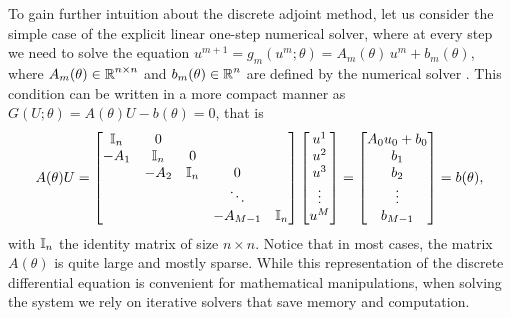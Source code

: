 To gain further intuition about the discrete adjoint method, let us consider the simple case of the explicit linear one-step numerical solver, where at every step we need to solve the equation $u^{m+1} = g_m (u^m; \theta) = A_m (\theta) \, u^m + b_m(\theta)$, where $A_m(\theta) \in \operatorname{\mathbb{R}}^{n \times n}$ and $b_m(\theta) \in \operatorname{\mathbb{R}}^n$ are defined by the numerical solver \cite{Johnson}. 
This condition can be written in a more compact manner as $G(U; \theta)=A(\theta) U - b(\theta) = 0$, that is 
\begin{equation}
    A(\theta) U 
    = 
    \begin{bmatrix}
        \operatorname{\mathbb{I}}_{n} & 0 &   &  & \\
        -A_1 & \operatorname{\mathbb{I}}_{n} & 0 &  &  \\
          & -A_2 & \operatorname{\mathbb{I}}_{n} & 0 &  \\
         &  &   & \ddots &   \\
         &  &  & -A_{M-1} & \operatorname{\mathbb{I}}_{n}
    \end{bmatrix}
    \begin{bmatrix}
        u^1 \\
        u^2 \\
        u^3 \\
        \vdots \\
        u^M
    \end{bmatrix}
    = 
    \begin{bmatrix}
        A_0 u_0 + b_0 \\
        b_1 \\
        b_2 \\
        \vdots \\
        b_{M-1}
    \end{bmatrix}
    = 
    b(\theta), 
\end{equation}
with $\operatorname{\mathbb{I}}_{n}$ the identity matrix of size $n \times n$.
Notice that in most cases, the matrix $A(\theta)$ is quite large and mostly sparse. 
While this representation of the discrete differential equation is  convenient for mathematical manipulations, when solving the system we rely on iterative solvers that save memory and computation. 

